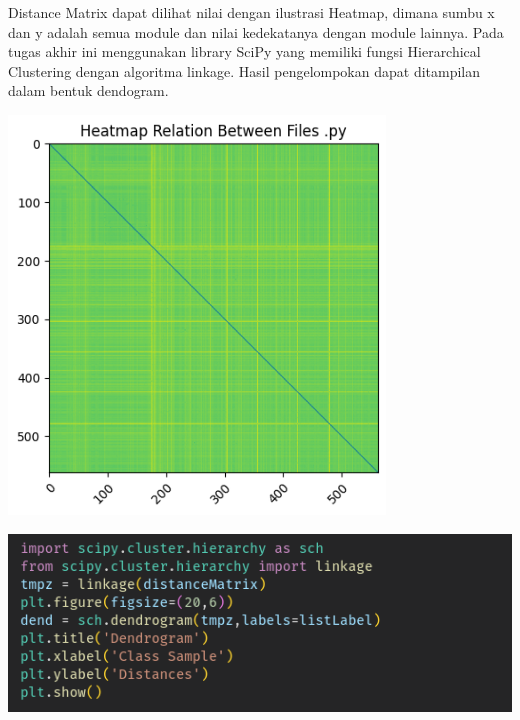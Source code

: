 Distance Matrix dapat dilihat nilai dengan ilustrasi Heatmap, dimana sumbu x dan y adalah semua module dan nilai kedekatanya dengan module lainnya. Pada tugas akhir ini menggunakan library SciPy yang memiliki fungsi Hierarchical Clustering dengan algoritma linkage. Hasil pengelompokan dapat ditampilan dalam bentuk dendogram.
\begin{center}
	\includegraphics[width=10cm]{img/bab_3/heatmap.png}
	\label{fig:asd}
\end{center}
\begin{center}
	\includegraphics[width=14cm]{img/bab_3/Clustering.png}
	\label{fig:asd}
\end{center}

